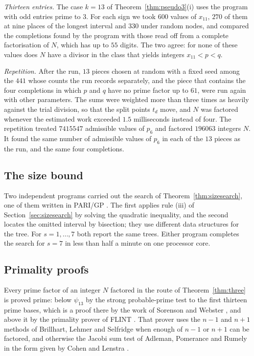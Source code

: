 \documentclass[11pt,reqno]{amsart}
\numberwithin{equation}{section}
\theoremstyle{plain}
\theoremstyle{definition}
\theoremstyle{remark}
\begin{document}
\emph{Thirteen entries.} The case $k=13$ of
Theorem~\ref{thm:pseudo3}(i) uses the program with odd entries prime
to $3$. For each sign we took $600$ values of $x_{11}$, $270$ of them
at nine places of the longest interval and $330$ under random nodes,
and compared the completions found by the program with those read off
from a complete factorisation of $N$, which has up to $55$ digits. The
two agree: for none of these values does $N$ have a divisor in the
class that yields integers $x_{11}<p<q$.

\emph{Repetition.} After the run, $13$ pieces chosen at random with a
fixed seed among the $441$ whose counts the run records separately,
and the
piece that contains the four completions in which $p$ and $q$ have no
prime factor up to $61$, were run again with other parameters. The
sums were weighted more than three times as heavily against the trial
division, so that the split points $t_d$ move, and $N$ was factored
whenever the estimated work exceeded $1.5$ milliseconds instead of
four. The repetition treated $7415547$ admissible values of $p_6$ and
factored $196063$ integers $N$. It found the same number of admissible
values of $p_6$ in each of the $13$ pieces as the run, and the same
four completions.

\subsection{The size bound}\label{app:size}
Two independent programs carried out the search of
Theorem~\ref{thm:sizesearch}, one of them written in PARI/GP
\cite{PARI}. The first applies rule (iii) of
Section~\ref{sec:sizesearch} by solving the quadratic inequality, and
the second locates the omitted interval by bisection; they use
different data structures for the tree. For $s=1,\dots,7$ both report
the same trees. Either program completes the search for $s=7$ in less
than half a minute on one processor core.

\subsection{Primality proofs}\label{app:primality}
Every prime factor of an integer $N$ factored in the route of
Theorem~\ref{thm:three} is proved prime: below $\psi_{13}$ by the
strong probable-prime test to the first thirteen prime bases, which is
a proof there by the work of Sorenson and Webster \cite{SW17}, and
above it by the primality prover of FLINT \cite{FLINT}. That prover
uses the $n-1$ and $n+1$ methods of Brillhart, Lehmer and Selfridge
\cite{BLS75} when enough of $n-1$ or $n+1$ can be factored, and
otherwise the Jacobi sum test of Adleman, Pomerance and Rumely
\cite{APR83} in the form given by Cohen and Lenstra \cite{CL84}.
\end{document}
